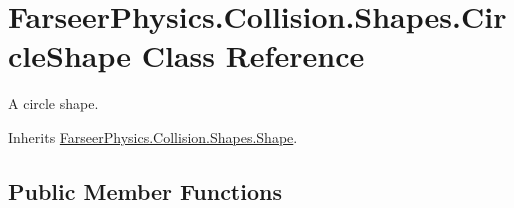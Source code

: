 \hypertarget{class_farseer_physics_1_1_collision_1_1_shapes_1_1_circle_shape}{\section{Farseer\+Physics.\+Collision.\+Shapes.\+Circle\+Shape Class Reference}
\label{class_farseer_physics_1_1_collision_1_1_shapes_1_1_circle_shape}
}


A circle shape.  




Inherits \hyperlink{class_farseer_physics_1_1_collision_1_1_shapes_1_1_shape}{Farseer\+Physics.\+Collision.\+Shapes.\+Shape}.

\subsection*{Public Member Functions}
